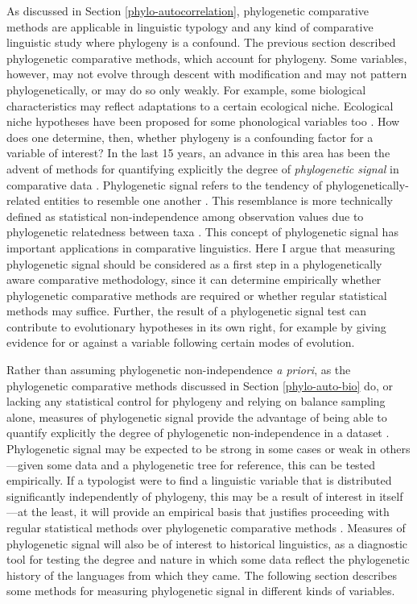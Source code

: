 As discussed in Section \ref{phylo-autocorrelation}, phylogenetic comparative methods are applicable in linguistic typology and any kind of comparative linguistic study where phylogeny is a confound. The previous section described phylogenetic comparative methods, which account for phylogeny. Some variables, however, may not evolve through descent with modification and may not pattern phylogenetically, or may do so only weakly. For example, some biological characteristics may reflect adaptations to a certain ecological niche. Ecological niche hypotheses have been proposed for some phonological variables too \autocites{everett_climate_2015}{everett_languages_2017}{blasi_grammars_2017}. How does one determine, then, whether phylogeny is a confounding factor for a variable of interest? In the last 15 years, an advance in this area has been the advent of methods for quantifying explicitly the degree of \emph{phylogenetic signal} in comparative data \autocites{freckleton_phylogenetic_2002}{blomberg_testing_2003}. Phylogenetic signal refers to the tendency of phylogenetically-related entities to resemble one another \autocites{blomberg_tempo_2002}[p.~717]{blomberg_testing_2003}. This resemblance is more technically defined as statistical non-independence among observation values due to phylogenetic relatedness between taxa \autocite[p.~591]{revell_phylogenetic_2008}. This concept of phylogenetic signal has important applications in comparative linguistics. Here I argue that measuring phylogenetic signal should be considered as a first step in a phylogenetically aware comparative methodology, since it can determine empirically whether phylogenetic comparative methods are required or whether regular statistical methods may suffice. Further, the result of a phylogenetic signal test can contribute to evolutionary hypotheses in its own right, for example by giving evidence for or against a variable following certain modes of evolution.

Rather than assuming phylogenetic non-independence \emph{a priori}, as the phylogenetic comparative methods discussed in Section \ref{phylo-auto-bio} do, or lacking any statistical control for phylogeny and relying on balance sampling alone, measures of phylogenetic signal provide the advantage of being able to quantify explicitly the degree of phylogenetic non-independence in a dataset \autocite[p.~591]{revell_phylogenetic_2008}. Phylogenetic signal may be expected to be strong in some cases or weak in others---given some data and a phylogenetic tree for reference, this can be tested empirically. If a typologist were to find a linguistic variable that is distributed significantly independently of phylogeny, this may be a result of interest in itself---at the least, it will provide an empirical basis that justifies proceeding with regular statistical methods over phylogenetic comparative methods \autocite[as in][]{irschick_comparison_1997}. Measures of phylogenetic signal will also be of interest to historical linguistics, as a diagnostic tool for testing the degree and nature in which some data reflect the phylogenetic history of the languages from which they came. The following section describes some methods for measuring phylogenetic signal in different kinds of variables.

